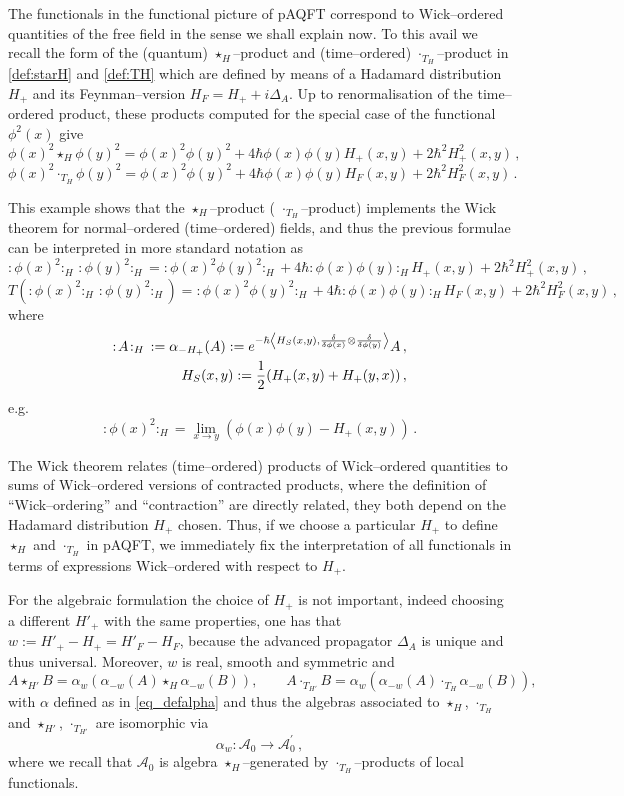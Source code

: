 \documentclass[a4paper,10pt,twoside]{article}
\numberwithin{equation}{section}
\newcounter{and}
\def\A{\mathcal{A}}
\newcommand{\wick}[1]{:\!{#1}\!:}
\theoremstyle{plain}
\theoremstyle{definition}
\begin{document}
The functionals in the functional picture of pAQFT correspond to Wick--ordered quantities of the free field in the sense we shall explain now. To this avail we recall the form of the (quantum) $\star_H$--product and (time--ordered) $\cdot_{T_H}$--product in \eqref{def:starH} and \eqref{def:TH} which are defined by means of a Hadamard distribution $H_+$ and its Feynman--version $H_F = H_+ + i \Delta_A$. Up to renormalisation of the time--ordered product, these products computed for the special case of the functional $\phi^2(x)$ give
$$
\phi(x)^2\star_H \phi(y)^2=\phi(x)^2\phi(y)^2+4\hbar \phi(x)\phi(y) H_+(x,y)+2\hbar^2 H^2_+(x,y)\,,
$$
$$
\phi(x)^2\cdot_{T_H}\phi(y)^2=\phi(x)^2\phi(y)^2+4\hbar \phi(x)\phi(y) H_F(x,y)+2\hbar^2 H^2_F(x,y)\,.
$$

This example shows that the $\star_H$--product ( $\cdot_{T_H}$--product) implements the Wick theorem for normal--ordered (time--ordered) fields, and thus the previous formulae can be interpreted in more standard notation as 
$$\wick{\phi(x)^2}_H\,\wick{\phi(y)^2}_H=\wick{\phi(x)^2\phi(y)^2}_H+4\hbar \wick{\phi(x)\phi(y)}_H H_+(x,y)+2\hbar^2 H^2_+(x,y)\,,$$
$$T\left(\wick{\phi(x)^2}_H\,\wick{\phi(y)^2}_H\right)=\wick{\phi(x)^2\phi(y)^2}_H+4\hbar \wick{\phi(x)\phi(y)}_H H_F(x,y)+2\hbar^2 H^2_F(x,y)\,,$$
where
\begin{eqnarray}\label{eq_defalpha}
{\wick{A}}_H\,:=\alpha_{-H_+}(A):=e^{-\hbar\left\langle H_S(x,y),\frac{\delta}{\delta\phi(x)}\otimes \frac{\delta}{\delta\phi(y)}\right\rangle}A\,,\\
H_S(x,y) := \frac12 (H_+(x,y)+H_+(y,x))\,,\notag
\end{eqnarray}
e.g. $$\wick{\phi(x)^2}_H=\lim_{x\to y}\left(\phi(x)\phi(y)-H_+(x,y)\right)\,.$$

The Wick theorem relates (time--ordered) products of Wick--ordered quantities to sums of Wick--ordered versions of contracted products, where the definition of ``Wick--ordering'' and ``contraction'' are directly related, they both depend on the Hadamard distribution  $H_+$ chosen. Thus, if we choose a particular $H_+$ to define $\star_H$ and $\cdot_{T_H}$ in pAQFT, we immediately fix the interpretation of all functionals in terms of expressions Wick--ordered with respect to $H_+$.

For the algebraic formulation the choice of $H_+$ is not important, indeed choosing a different $H'_+$ with the same properties, one has that $w:=H'_+-H_+=H'_F-H_F$, because the advanced propagator $\Delta_A$ is unique and thus universal. Moreover, $w$ is real, smooth and symmetric and
$$A\star_{H'}B=\alpha_w\left(\alpha_{-w}(A)\star_H\alpha_{-w}(B)\right),\qquad A\cdot_{T_{H'}}B=\alpha_w\left(\alpha_{-w}(A)\cdot_{T_H}\alpha_{-w}(B)\right),$$
with $\alpha$ defined as in \eqref{eq_defalpha} and thus the algebras associated to $\star_H$, $\cdot_{T_H}$ and  $\star_{H'}$, $\cdot_{T_{H'}}$ are isomorphic via $$\alpha_{w}:\A_0\to \A^\prime_0\,,$$ where we recall that $\A_0$ is algebra $\star_H$--generated by $\cdot_{T_H}$--products of local functionals.
\end{document}
